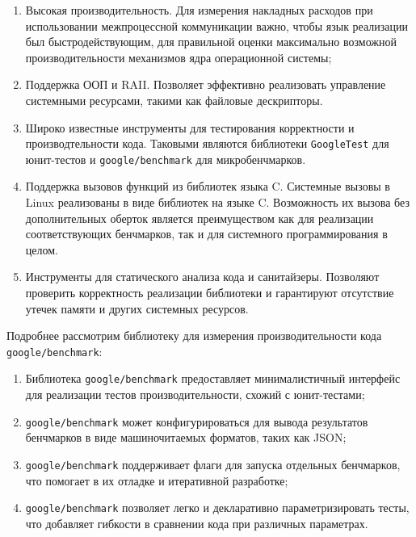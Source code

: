 \documentclass[14pt, russian]{scrartcl}
\begin{document}
\begin{enumerate}
  \item Высокая производительность. Для измерения накладных расходов при
        использовании межпроцессной коммуникации важно, чтобы язык реализации
        был быстродействующим, для правильной оценки максимально возможной
        производительности механизмов ядра операционной системы;
  \item Поддержка ООП и RAII. Позволяет эффективно реализовать управление
        системными ресурсами, такими как файловые дескрипторы.
  \item Широко известные инструменты для тестирования корректности и
        производтельности кода. Таковыми являются библиотеки
        \verb|GoogleTest|\cite{GoogleTest} для юнит-тестов и
        \verb|google/benchmark|\cite{GoogleBenchmark} для микробенчмарков.
  \item Поддержка вызовов функций из библиотек языка C. Системные вызовы в Linux
        реализованы в виде библиотек на языке C. Возможность их вызова без
        дополнительных оберток является преимуществом как для реализации
        соответствующих бенчмарков, так и для системного программирования в
        целом.
  \item Инструменты для статического анализа кода и санитайзеры. Позволяют
        проверить корректность реализации библиотеки и гарантируют отсутствие
        утечек памяти и других системных ресурсов.
\end{enumerate}

Подробнее рассмотрим библиотеку для измерения производительности кода
\verb|google/benchmark|\cite{GoogleBenchmark}:

\begin{enumerate}
  \item Библиотека \verb|google/benchmark| предоставляет минималистичный
        интерфейс для реализации тестов производительности, схожий с
        юнит-тестами;

  \item \verb|google/benchmark| может конфигурироваться для вывода результатов
        бенчмарков в виде машиночитаемых форматов, таких как JSON;

  \item \verb|google/benchmark| поддерживает флаги для запуска отдельных
        бенчмарков, что помогает в их отладке и итеративной разработке;

  \item \verb|google/benchmark| позволяет легко и декларативно параметризировать
        тесты, что добавляет гибкости в сравнении кода при различных параметрах.

\end{enumerate}
\end{document}
